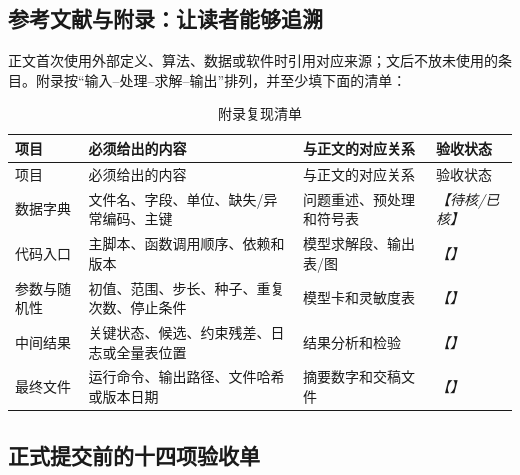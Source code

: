 \documentclass[UTF8,zihao=-4]{ctexart}
\newcommand{\slot}[1]{\textcolor{inkblue}{\textit{【#1】}}}
\begin{document}
\subsection{参考文献与附录：让读者能够追溯}

正文首次使用外部定义、算法、数据或软件时引用对应来源；文后不放未使用的条目。附录按“输入--处理--求解--输出”排列，并至少填下面的清单：

\begin{longtable}{p{3.0cm}p{4.2cm}p{4.2cm}p{3.2cm}}
\caption{附录复现清单}\label{tab:template-appendix-ledger}\\
\toprule
项目 & 必须给出的内容 & 与正文的对应关系 & 验收状态\\
\midrule
\endfirsthead
\toprule
项目 & 必须给出的内容 & 与正文的对应关系 & 验收状态\\
\midrule
\endhead
数据字典 & 文件名、字段、单位、缺失/异常编码、主键 & 问题重述、预处理和符号表 & \slot{待核/已核}\\
代码入口 & 主脚本、函数调用顺序、依赖和版本 & 模型求解段、输出表/图 & \slot{}\\
参数与随机性 & 初值、范围、步长、种子、重复次数、停止条件 & 模型卡和灵敏度表 & \slot{}\\
中间结果 & 关键状态、候选、约束残差、日志或全量表位置 & 结果分析和检验 & \slot{}\\
最终文件 & 运行命令、输出路径、文件哈希或版本日期 & 摘要数字和交稿文件 & \slot{}\\
\bottomrule
\end{longtable}

\subsection{正式提交前的十四项验收单}
\end{document}
